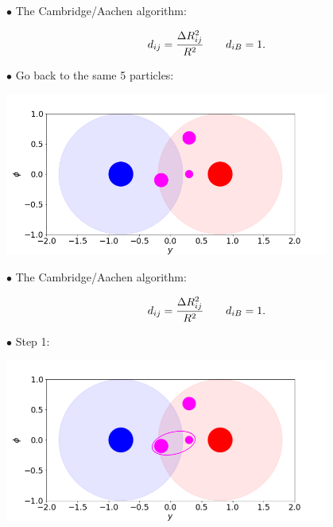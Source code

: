 \documentclass[9pt,a4paper,unknownkeysallowed,xcolor=dvipsnames,aspectratio=43]{beamer}
\begin{document}
\begin{frame}

{\color{darkred}\Large$\bullet$} {\color{darkred} The Cambridge/Aachen algorithm:}

  \begin{equation}
    d_{ij} = \frac{\Delta R_{ij}^2}{R^2}\qquad d_{iB} = 1.\notag
  \end{equation}
 \vspace{2mm}
  
{\color{darkred}\Large$\bullet$} Go back to the same 5 particles:
\vspace{2mm}
\begin{center}
\includegraphics[width=0.8\textwidth]{kt0.png}
\end{center}
\end{frame}
%
%
\begin{frame}

{\color{darkred}\Large$\bullet$} {\color{darkred} The Cambridge/Aachen algorithm:}

  \begin{equation}
    d_{ij} = \frac{\Delta R_{ij}^2}{R^2}\qquad d_{iB} = 1.\notag
  \end{equation}
 \vspace{2mm}
  
{\color{darkred}\Large$\bullet$} Step 1:
\vspace{2mm}
\begin{center}
\includegraphics[width=0.8\textwidth]{ca01.png}
\end{center}
\end{frame}
\end{document}
